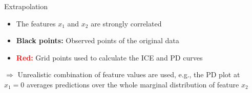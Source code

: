 \documentclass[11pt,compress,t,notes=noshow, aspectratio=169, xcolor=table]{beamer}
\begin{document}
\begin{frame}{Extrapolation}
\begin{itemize}
\item The features $x_1$ and $x_2$ are strongly correlated
\item \textbf{Black points:} Observed points of the original data
\item \textbf{\textcolor{red}{Red:}} Grid points used to calculate the ICE and PD curves
\end{itemize}
$\Rightarrow$ Unrealistic combination of feature values are used, e.g., the PD plot at $x_1=0$ averages predictions over the whole marginal distribution of feature $x_2$
%
%
%
%
\end{frame}




%
%
\end{document}
